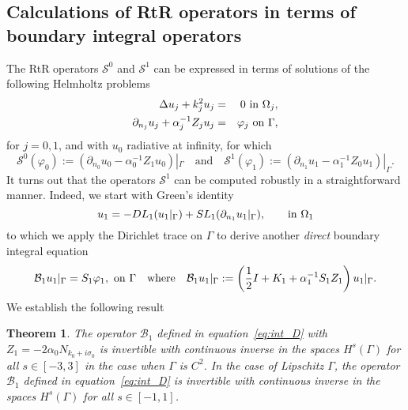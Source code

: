 \documentclass[11pt]{article}
\numberwithin{equation}{section}
\newtheorem{theorem}{Theorem}[section]
\begin{document}
 \subsection{Calculations of RtR operators in terms of boundary integral operators~\label{rtr}}


The RtR operators $\mathcal S^0$ and $\mathcal S^1$ can be expressed in terms of solutions of the following Helmholtz problems
 \begin{eqnarray*}
   \Delta u_j+k_j^2u_j&=&0\ {\rm in}\ \Omega_j,\nonumber\\
   \partial_{n_j} u_j+\alpha_j^{-1}Z_ju_j&=&\varphi_j\ {\rm on}\ \Gamma,
 \end{eqnarray*}
for $j=0,1$, and with $u_0$ radiative at infinity, for which
\begin{equation*}
   \mathcal{S}^0(\varphi_0):=(\partial_{n_0} u_0-\alpha_0^{-1}Z_1u_0)|_{\Gamma}\quad\mbox{and}\quad \mathcal{S}^1(\varphi_1):=(\partial_{n_1} u_1-\alpha_1^{-1}Z_0u_1)|_{\Gamma}.
 \end{equation*}
 It turns out that the operators $\mathcal{S}^1$ can be computed robustly in a straightforward manner. Indeed, we start with Green's identity
\[
u_1=-DL_1(u_1|_\Gamma)+SL_1(\partial_{n_1}u_1|_\Gamma),\qquad{\rm in}\ \Omega_1
\]
to which we apply the Dirichlet trace on $\Gamma$ to derive another {\em direct} boundary integral equation
\begin{equation}\label{eq:int_D}
  \mathcal{B}_1u_1|_\Gamma=S_1\varphi_1,\ {\rm on}\ \Gamma\quad\mbox{where}\quad \mathcal{B}_1u_1|_\Gamma:=\left(\frac{1}{2}I+K_1+\alpha_1^{-1}S_1Z_1\right)u_1|_\Gamma.
\end{equation}
We establish the following result
\begin{theorem}\label{eq:inv_1}
 The operator $\mathcal{B}_1$ defined in equation~\eqref{eq:int_D} with $Z_1=-2\alpha_0 N_{k_0+i\sigma_0}$  is invertible with continuous inverse in the spaces $H^s(\Gamma)$ for all $s\in[-3,3]$ in the case when $\Gamma$ is $C^2$. In the case of Lipschitz $\Gamma$, the operator $\mathcal{B}_1$ defined in equation~\eqref{eq:int_D} is invertible with continuous inverse in the spaces $H^s(\Gamma)$ for all $s\in[-1,1]$.
\end{theorem}
\end{document}
